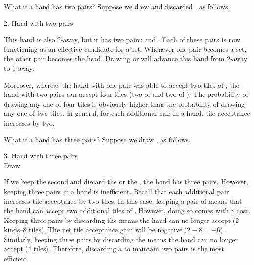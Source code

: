 \bigskip
What if a hand has two pairs? Suppose we drew {\LARGE{}} and discarded {\LARGE\bei}, as follows.

\bigskip
\begin{itembox}[r]{2. Hand with two pairs}
\bp
{}
\ep
\end{itembox}
\noindent This hand is also 2-away, but it has two pairs: {\LARGE{}} and {\LARGE{}}. 
Each of these pairs is now functioning as an effective candidate for a set. Whenever one pair becomes a set, the other pair becomes the head. Drawing {\LARGE{}} or {\LARGE{}} will advance this hand from 2-away to 1-away. 

\bigskip
Moreover, whereas the hand with one pair was able to accept two tiles of {\LARGE{}}, the hand with two pairs can accept four tiles (two of {\LARGE{}} and two of {\LARGE{}}). The probability of drawing any one of four tiles is obviously higher than the probability of drawing any one of two tiles. 
In general, for each additional pair in a hand, tile acceptance increases by two. 

\bigskip
What if a hand has three pairs? Suppose we draw {\LARGE{}}, as follows. 

\bigskip
\begin{itembox}[r]{3. Hand with three pairs}
\bp
{}~\\
\hfill\footnotesize{Draw~~~~~~~~~~~}
\ep
\end{itembox}
\noindent If we keep the second {\LARGE{}} and discard the {\LARGE{}} or the {\LARGE{}}, the hand has three pairs. However, keeping three pairs in a hand is inefficient. Recall that each additional pair increases tile acceptance by two tiles. In this case, keeping a pair of {\LARGE{}} means that the hand can accept two additional tiles of {\LARGE{}}. However, doing so comes with a cost. Keeping three pairs by discarding the {\LARGE{}} means the hand can no longer accept {\LARGE{} } (2 kinds--8 tiles). The net tile acceptance gain will be negative ($2-8 = -6$). Similarly, keeping three pairs by discarding the {\LARGE{}} means the hand can no longer accept {\LARGE{}} (4 tiles). 
Therefore, discarding a {\LARGE{}} to maintain two pairs is the most efficient. 

